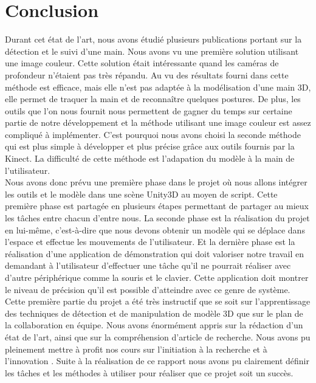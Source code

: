 \chapter*{Conclusion}
Durant cet état de l'art, nous avons étudié plusieurs publications portant sur la détection et le suivi
d'une main. Nous avons vu une première solution utilisant une image couleur. Cette solution était
intéressante quand les caméras de profondeur n'étaient pas très répandu. Au vu des résultats fourni dans
\cite{haarlike} cette méthode est efficace, mais elle n'est pas adaptée à la modélisation d'une main 3D, elle permet
de traquer la main et de reconnaître quelques postures. De plus, les outils que l'on nous fournit nous permettent
de gagner du temps sur certaine partie de notre développement et la méthode utilisant une image couleur
est assez compliqué à implémenter. C'est pourquoi nous avons choisi la seconde méthode qui est plus
simple à développer et plus précise grâce aux outils fournis par la Kinect. La difficulté de cette méthode
est l'adapation du modèle à la main de l'utilisateur.\\

Nous avons donc prévu une première phase dans le projet où nous allons intégrer les outils et le modèle
dans une scène Unity3D au moyen de script. Cette première phase est partagée en plusieurs étapes permettant
de partager au mieux les tâches entre chacun d'entre nous. La seconde phase est la réalisation du projet en lui-même, c'est-à-dire 
que nous devons obtenir un modèle qui se déplace dans l'espace et effectue les mouvements de l'utilisateur.
Et la dernière phase est la réalisation d'une application de démonstration qui doit valoriser notre travail
en demandant à l'utilisateur d'effectuer une tâche qu'il ne pourrait réaliser avec d'autre périphérique comme
la souris et le clavier. Cette application doit montrer le niveau de précision qu'il est possible d'atteindre
avec ce genre de système.\\

Cette première partie du projet a été très instructif que se soit sur l'apprentissage des techniques de détection et de manipulation
de modèle 3D que sur le plan de la collaboration en équipe. Nous avons énormément appris sur la rédaction d'un
état de l'art, ainsi que sur la compréhension d'article de recherche. Nous avons pu pleinement mettre à profit
nos cours sur \og l'initiation à la recherche et à l'innovation \fg. Suite à la réalisation de ce rapport nous avons pu
clairement définir les tâches et les méthodes à utiliser pour réaliser que ce projet soit un succès. 

